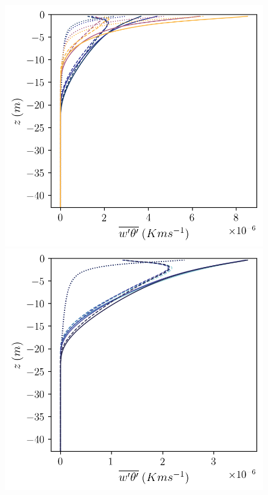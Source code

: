 \documentclass[draft,jgrga]{agutexSI2019}
\begin{document}
\begin{figure}[]
    \centering
    \begin{minipage}{0.5\textwidth}
        \includegraphics[trim={0 0 0 0},clip, width=\textwidth]{Figures/heatflux_res_sgs_cmp_dT_8h_tav13h_z_profile.png}
    \end{minipage}%
    \begin{minipage}{0.5\textwidth}
        \includegraphics[trim={0 0 0 0},clip, width=\textwidth]{Figures/heatflux_res_sgs_cmp_dslope_8h_tav13h_z_profile.png}

\end{minipage}
\end{figure}
\end{document}
